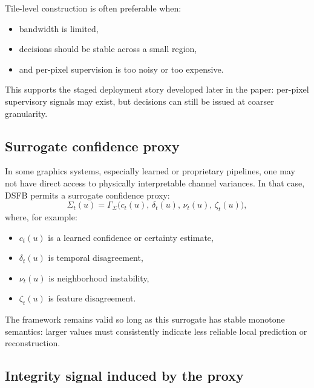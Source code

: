 \documentclass[11pt]{article}
\theoremstyle{definition}
\theoremstyle{plain}
\begin{document}
Tile-level construction is often preferable when:
\begin{itemize}[leftmargin=1.5em]
    \item bandwidth is limited,
    \item decisions should be stable across a small region,
    \item and per-pixel supervision is too noisy or too expensive.
\end{itemize}

This supports the staged deployment story developed later in the paper: per-pixel supervisory signals may exist, but decisions can still be issued at coarser granularity.


\subsection{Surrogate confidence proxy}

In some graphics systems, especially learned or proprietary pipelines, one may not have direct access to physically interpretable channel variances. In that case, DSFB permits a surrogate confidence proxy:
\begin{equation}
\Sigma_t(u)=\Gamma_{\Sigma}\!\bigl(
c_t(u),\,
\delta_t(u),\,
\nu_t(u),\,
\zeta_t(u)
\bigr),
\end{equation}
where, for example:
\begin{itemize}[leftmargin=1.5em]
    \item $c_t(u)$ is a learned confidence or certainty estimate,
    \item $\delta_t(u)$ is temporal disagreement,
    \item $\nu_t(u)$ is neighborhood instability,
    \item $\zeta_t(u)$ is feature disagreement.
\end{itemize}

The framework remains valid so long as this surrogate has stable monotone semantics: larger values must consistently indicate less reliable local prediction or reconstruction.


\subsection{Integrity signal induced by the proxy}
\end{document}
